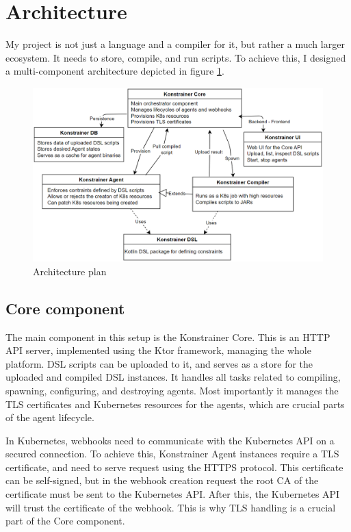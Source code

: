 \clearpage\section{Architecture}

My project is not just a language and a compiler for it, but rather a much larger ecosystem. It needs to store, compile, and run scripts. To achieve this, I designed a multi-component architecture depicted in figure \ref{fig:comp_arch}.

\begin{figure}[h]
    \centering
    \includegraphics[width=150mm, keepaspectratio]{content/75_implementation/xarch.png}
    \caption{Architecture plan}
    \label{fig:comp_arch}
\end{figure}

\subsection{Core component}

The main component in this setup is the Konstrainer Core. This is an HTTP API server, implemented using the Ktor framework, managing the whole platform. DSL scripts can be uploaded to it, and serves as a store for the uploaded and compiled DSL instances. It handles all tasks related to compiling, spawning, configuring, and destroying agents. Most importantly it manages the TLS certificates and Kubernetes resources for the agents, which are crucial parts of the agent lifecycle.

In Kubernetes, webhooks need to communicate with the Kubernetes API on a secured connection. To achieve this, Konstrainer Agent instances require a TLS certificate, and need to serve request using the HTTPS protocol. This certificate can be self-signed, but in the webhook creation request the root CA of the certificate must be sent to the Kubernetes API. After this, the Kubernetes API will trust the certificate of the webhook. This is why TLS handling is a crucial part of the Core component.

